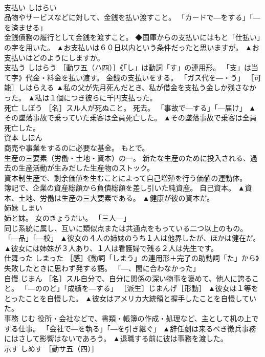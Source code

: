 \documentclass[8pt]{extreport}
\begin{document}
\begin{CJK}{UTF8}{min}
\\	支払い	しはらい	
\\	品物やサービスなどに対して、金銭を払い渡すこと。 「カードで―をする」「―を済ませる」 
\\	金銭債務の履行として金銭を渡すこと。 ◆国庫からの支払いにはもと「仕払い」の字を用いた。	▲お支払いは６０日以内という条件だったと思いますが。 ▲お支払いはどのようにしますか。
\\	支払う	しはらう	［動ワ五（ハ四）］《「し」は動詞「す」の連用形。 「支」は当て字》代金・料金を払い渡す。 金銭の支払いをする。 「ガス代を―・う」 ［可能］しはらえる	▲私の父が先月死んだとき、私が借金を支払う金しか残さなかった。 ▲私は１個につき彼らに千円支払った。
\\	死亡	しぼう	［名］スル人が死ぬこと。 死去。 「事故で―する」「―届け」	▲その墜落事故で乗っていた乗客は全員死亡した。 ▲その墜落事故で乗客は全員死亡した。
\\	資本	しほん	
\\	商売や事業をするのに必要な基金。 もとで。 
\\	生産の三要素（労働・土地・資本）の一。 新たな生産のために投入される、過去の生産活動が生みだした生産物のストック。 
\\	資本制生産で、剰余価値を生むことによって自己増殖を行う価値の運動体。 
\\	簿記で、企業の資産総額から負債総額を差し引いた純資産。 自己資本。	▲資本、土地、労働は生産の三大要素である。 ▲健康が彼の資本だ。
\\	姉妹	しまい	
\\	姉と妹。 女のきょうだい。 「三人―」 
\\	同じ系統に属し、互いに類似点または共通点をもっている二つ以上のもの。 「―品」「―校」	▲彼女の４人の姉妹のうち１人は他界したが、ほかは健在だ。 ▲彼女には姉妹が３人あり、１人は看護婦で残る２人は先生です。
\\	仕舞った	しまった	［感］《動詞「しまう」の連用形＋完了の助動詞「た」から》失敗したときに思わず発する語。 「―、間に合わなかった」	
\\	自慢	じまん	［名］スル自分で、自分に関係の深い物事を褒めて、他人に誇ること。 「―ののど」「成績を―する」 ［派生］じまんげ［形動］	▲彼女は１等をとったことを自慢した。 ▲彼女はアメリカ大統領と握手したことを自慢していた。
\\	事務	じむ	役所・会社などで、書類・帳簿の作成・処理など、主として机の上でする仕事。 「会社で―を執る」「―を引き継ぐ」	▲辞任劇は来るべき徴兵事務にはさして影響はないであろう。 ▲退職する前に彼は事務を渡した。
\\	示す	しめす	［動サ五（四）］ 

\end{CJK}
\end{document}
